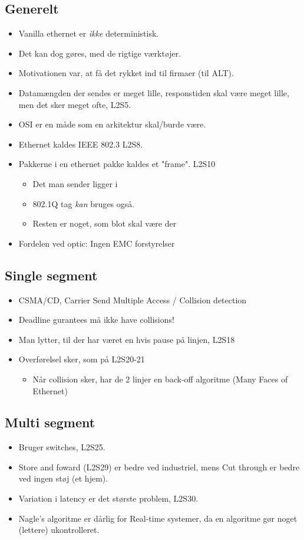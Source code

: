 \documentclass[oneside, 10pt]{article}
\begin{document}
\subsection{Generelt}
\begin{itemize}
	\item Vanilla ethernet er \emph{ikke} deterministisk.
	\item Det kan dog gøres, med de rigtige værktøjer.
	\item Motivationen var, at få det rykket ind til firmaer (til ALT).
	\item Datamængden der sendes er meget lille, responstiden skal være meget lille, men det sker meget ofte, L2S5.
	\item OSI er en måde som en arkitektur skal/burde være.
	\item Ethernet kaldes IEEE 802.3 L2S8.
	\item Pakkerne i en ethernet pakke kaldes et "frame". L2S10
	\begin{itemize}
		\item Det man sender ligger i 
		\item 802.1Q tag \emph{kan} bruges også.
		\item Resten er noget, som blot skal være der
	\end{itemize}

	\item Fordelen ved optic: Ingen EMC forstyrelser
\end{itemize}

\subsection{Single segment}
\begin{itemize}
	\item CSMA/CD, Carrier Send Multiple Access / Collision detection
	\item Deadline gurantees må ikke have collisions!
	\item Man lytter, til der har været en hvis pause på linjen, L2S18
	\item Overførelsel sker, som på L2S20-21
	\begin{itemize}
		\item Når collision sker, har de 2 linjer en back-off algoritme (Many Faces of Ethernet)
	\end{itemize}
\end{itemize}


\subsection{Multi segment}
\begin{itemize}
	\item Bruger switches, L2S25.
	\item Store and foward (L2S29) er bedre ved industriel, mens Cut through er bedre ved ingen støj (et hjem).
	\item Variation i latency er det største problem, L2S30.
	\item Nagle's algoritme er dårlig for Real-time systemer, da en algoritme gør noget (lettere) ukontrolleret.
\end{itemize}
\end{document}
